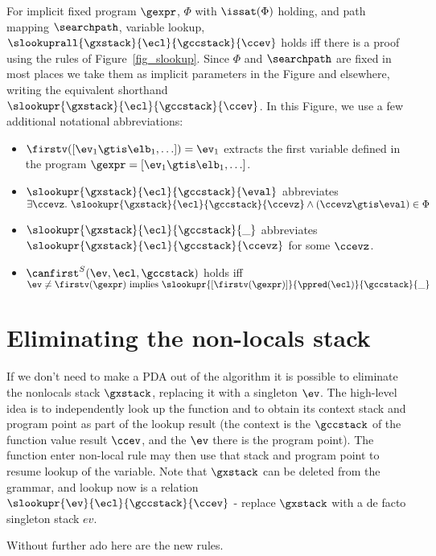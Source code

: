 \begin{definition}
  \label{def_symbolic_lookup}
For implicit fixed program $\gexpr$, $\Phi$ with $\issat(\Phi)$ holding, and path mapping $\searchpath$, \ddse{} variable lookup, $\slookuprall{\gxstack}{\ecl}{\gccstack}{\ccev}$ holds iff there is a proof using the rules of Figure~\ref{fig_slookup}.  Since $\Phi$ and $\searchpath$ are fixed in most places we take them as implicit parameters in the Figure and elsewhere, writing the equivalent shorthand $\slookupr{\gxstack}{\ecl}{\gccstack}{\ccev}$.
In this Figure, we use a few additional notational abbreviations:
\begin{itemize}
\item $\firstv([\ev_1 \gtis \elb_1, \ldots]) = \ev_1$ extracts the first variable defined in the program $\gexpr=[\ev_1 \gtis \elb_1, \ldots]$.
\item $\slookupr{\gxstack}{\ecl}{\gccstack}{\eval}$ abbreviates  $\exists \ccevz.\ \slookupr{\gxstack}{\ecl}{\gccstack}{\ccevz} \land (\ccevz \gtis \eval) \in \Phi$
\item $\slookupr{\gxstack}{\ecl}{\gccstack}{\_}$ abbreviates $\slookupr{\gxstack}{\ecl}{\gccstack}{\ccevz}$ for some $\ccevz$.
\item $\canfirst^S(\ev,\ecl,\gccstack)$ holds iff $\ev \neq \firstv(\gexpr) \text{ implies } \slookupr{[\firstv(\gexpr)]}{\ppred(\ecl)}{\gccstack}{\_}$
\end{itemize}
\end{definition}


\section{Eliminating the non-locals stack}

If we don't need to make a PDA out of the algorithm it is possible to eliminate the nonlocals stack $\gxstack$, replacing it with a singleton $\ev$.  The high-level idea is to independently look up the function and to obtain its context stack and program point as part of the lookup result (the context is the $\gccstack$ of the function value result $\ccev$, and the $\ev$ there is the program point).  The function enter non-local rule may then use that stack and program point to resume lookup of the variable.   Note that $\gxstack$ can be deleted from the grammar, and lookup now is a relation $\slookupr{\ev}{\ecl}{\gccstack}{\ccev}$ - replace $\gxstack$ with a de facto singleton stack $ev$.


Without further ado here are the new rules. 


